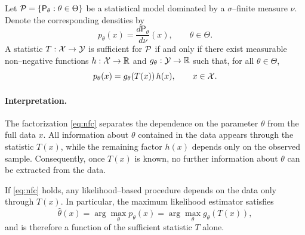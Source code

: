 \begin{theo}
\label{theo:nfc}
Let $\mathcal{P}=\{\mathsf{P}_{\theta}:\theta\in\Theta\}$ be a statistical model dominated by a
$\sigma$--finite measure $\nu$.
Denote the corresponding densities by
\[
p_{\theta}(x) = \frac{d\mathsf{P}_{\theta}}{d\nu}(x), \qquad \theta\in\Theta.
\]
A statistic $T:\mathcal{X}\to\mathcal{Y}$ is sufficient for $\mathcal{P}$ if and only if there exist
measurable non--negative functions $h:\mathcal{X}\to\mathbb{R}$ and
$g_{\theta}:\mathcal{Y}\to\mathbb{R}$ such that, for all $\theta\in\Theta$,
\begin{equation}
\label{eq:nfc}
p_{\theta}(x) = g_{\theta}(T(x))\,h(x),
\qquad x\in\mathcal{X}.
\end{equation}
\end{theo}

\paragraph{Interpretation.}
The factorization \eqref{eq:nfc} separates the dependence on the parameter $\theta$
from the full data $x$.
All information about $\theta$ contained in the data appears through the statistic $T(x)$,
while the remaining factor $h(x)$ depends only on the observed sample.
Consequently, once $T(x)$ is known, no further information about $\theta$ can be extracted
from the data.

\begin{remark}[]
If \eqref{eq:nfc} holds, any likelihood--based procedure depends on the data only through
$T(x)$.
In particular, the maximum likelihood estimator satisfies
\[
\hat{\theta}(x)
= \arg\max_{\theta} p_{\theta}(x)
= \arg\max_{\theta} g_{\theta}(T(x)),
\]
and is therefore a function of the sufficient statistic $T$ alone.
\end{remark}

